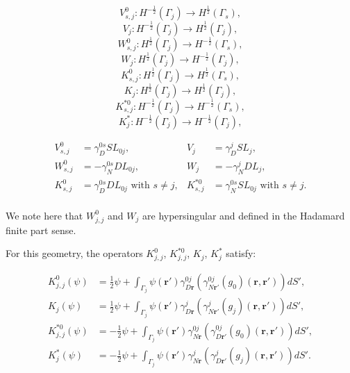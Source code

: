 \documentclass[]{article}%
\begin{document}
$$ V_{s,j}^0 : H^{-\frac{1}{2}}(\Gamma_j) \rightarrow H^{\frac{1}{2}}(\Gamma_s),$$
$$ V_{j}: H^{-\frac{1}{2}}(\Gamma_j) \rightarrow H^{\frac{1}{2}}(\Gamma_j),$$
 $$W_{s,j}^0: H^{\frac{1}{2}}(\Gamma_j) \rightarrow H^{-\frac{1}{2}}(\Gamma_s),$$
 $$W_{j}: H^{\frac{1}{2}}(\Gamma_j) \rightarrow H^{-\frac{1}{2}}(\Gamma_j) ,$$
$$ K_{s,j}^0: H^{\frac{1}{2}}(\Gamma_j) \rightarrow H^{\frac{1}{2}}(\Gamma_s),$$
 $$K_{j}: H^{\frac{1}{2}}(\Gamma_j) \rightarrow H^{\frac{1}{2}}(\Gamma_j) ,$$
 $$K^{*0}_{s,j}: H^{-\frac{1}{2}}(\Gamma_j) \rightarrow H^{-\frac{1}{2}}(\Gamma_s),$$
 $$K^*_{j}: H^{-\frac{1}{2}}(\Gamma_j) \rightarrow H^{-\frac{1}{2}}(\Gamma_j),$$
 
\begin{align*}
 V_{s,j}^0 &=   \gamma_D^{0s} SL_{0j},
 & V_{j}&=  \gamma_D^{j} SL_{j},\\
 W_{s,j}^0 &=-  \gamma_N^{0s} DL_{0j},
 & W_{j} &=- \gamma_N^{j} DL_{j}, \\
 K_{s,j}^0&= \gamma_D^{0s} DL_{0j}\mbox{ with } s \not=j,
 & K^{*0}_{s,j} &= \gamma_N ^{0s} SL_{0j}\mbox{ with } s \not=j.\\
\end{align*}

We note here that $W_{j,j}^0$ and $W_{j}$ are hypersingular and defined in the Hadamard finite part sense.

For this geometry, the operators $K_{j,j}^0$, $K^{*0}_{j,j}$, $K_{j}$, $K^*_{j}$ satisfy:

\begin{align*}
 K_{j,j}^0(\psi) &= \frac{1}{2}\psi + \int_{\Gamma_j}  \psi\left(\mathbf{r}'\right) \gamma_{D\mathbf{r}}^{0j} \left( \gamma_{N{\mathbf{r}'}}^{0j} \left(g_0\right)\left(\mathbf{r},\mathbf{r'}\right) \right) dS',\\ 
 K_{j}(\psi) &= \frac{1}{2} \psi +\int_{\Gamma_j}  {\psi\left(\mathbf{r}'\right) \gamma_{D\mathbf{r}}^{j} \left(\gamma_{N{\mathbf{r}'}}^{j} \left(g_j\right)\left(\mathbf{r},\mathbf{r'}\right) \right) dS'},\\
 K^{*0}_{j,j}(\psi) &= -\frac{1}{2} \psi + \int_{\Gamma_j}  {\psi\left(\mathbf{r}'\right) \gamma_{N\mathbf{r}}^{0j}\left(\gamma_{D\mathbf{r}'}^{0j}\left(g_0\right)\left(\mathbf{r},\mathbf{r'}\right)\right) dS'},\\
 K^*_{j}(\psi) &= -\frac{1}{2} \psi + \int_{\Gamma_j}  {\psi\left(\mathbf{r}' \right) \gamma_{N\mathbf{r}}^j\left(\gamma_{D\mathbf{r}'}^{j}\left(g_j\right)\left(\mathbf{r},\mathbf{r'}\right)\right) dS'}.
\end{align*}
\end{document}
